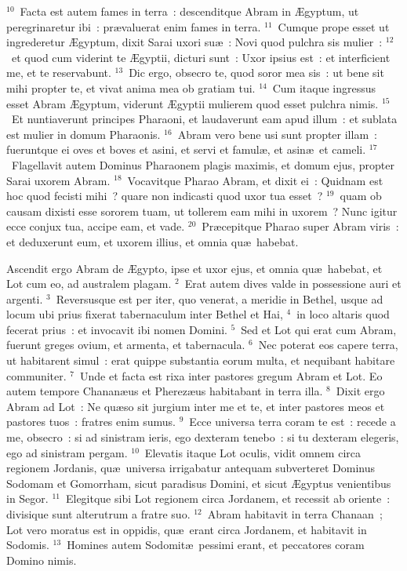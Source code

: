 ${}^{10}$~Facta est autem fames in terra~: descenditque Abram in \AE gyptum, ut peregrinaretur ibi~: pr\ae valuerat enim fames in terra.
${}^{11}$~Cumque prope esset ut ingrederetur \AE gyptum, dixit Sarai uxori su\ae~: Novi quod pulchra sis mulier~:
${}^{12}$~et quod cum viderint te \AE gyptii, dicturi sunt~: Uxor ipsius est~: et interficient me, et te reservabunt.
${}^{13}$~Dic ergo, obsecro te, quod soror mea sis~: ut bene sit mihi propter te, et vivat anima mea ob gratiam tui.
${}^{14}$~Cum itaque ingressus esset Abram \AE gyptum, viderunt \AE gyptii mulierem quod esset pulchra nimis.
${}^{15}$~Et nuntiaverunt principes Pharaoni, et laudaverunt eam apud illum~: et sublata est mulier in domum Pharaonis.
${}^{16}$~Abram vero bene usi sunt propter illam~: fueruntque ei oves et boves et asini, et servi et famul\ae , et asin\ae\ et cameli.
${}^{17}$~Flagellavit autem Dominus Pharaonem plagis maximis, et domum ejus, propter Sarai uxorem Abram.
${}^{18}$~Vocavitque Pharao Abram, et dixit ei~: Quidnam est hoc quod fecisti mihi~? quare non indicasti quod uxor tua esset~?
${}^{19}$~quam ob causam dixisti esse sororem tuam, ut tollerem eam mihi in uxorem~? Nunc igitur ecce conjux tua, accipe eam, et vade.
${}^{20}$~Pr\ae cepitque Pharao super Abram viris~: et deduxerunt eum, et uxorem illius, et omnia qu\ae\ habebat.

\lettrine[lines=3,image=true,loversize=0.05,lraise=-0.03]{A}{}scendit ergo Abram de \AE gypto, ipse et uxor ejus, et omnia qu\ae\ habebat, et Lot cum eo, ad australem plagam.
${}^{2}$~Erat autem dives valde in possessione auri et argenti.
${}^{3}$~Reversusque est per iter, quo venerat, a meridie in Bethel, usque ad locum ubi prius fixerat tabernaculum inter Bethel et Hai,
${}^{4}$~in loco altaris quod fecerat prius~: et invocavit ibi nomen Domini.
${}^{5}$~Sed et Lot qui erat cum Abram, fuerunt greges ovium, et armenta, et tabernacula.
${}^{6}$~Nec poterat eos capere terra, ut habitarent simul~: erat quippe substantia eorum multa, et nequibant habitare communiter.
${}^{7}$~Unde et facta est rixa inter pastores gregum Abram et Lot. Eo autem tempore Chanan\ae us et Pherez\ae us habitabant in terra illa.
${}^{8}$~Dixit ergo Abram ad Lot~: Ne qu\ae so sit jurgium inter me et te, et inter pastores meos et pastores tuos~: fratres enim sumus.
${}^{9}$~Ecce universa terra coram te est~: recede a me, obsecro~: si ad sinistram ieris, ego dexteram tenebo~: si tu dexteram elegeris, ego ad sinistram pergam.
${}^{10}$~Elevatis itaque Lot oculis, vidit omnem circa regionem Jordanis, qu\ae\ universa irrigabatur antequam subverteret Dominus Sodomam et Gomorrham, sicut paradisus Domini, et sicut \AE gyptus venientibus in Segor.
${}^{11}$~Elegitque sibi Lot regionem circa Jordanem, et recessit ab oriente~: divisique sunt alterutrum a fratre suo.
${}^{12}$~Abram habitavit in terra Chanaan~; Lot vero moratus est in oppidis, qu\ae\ erant circa Jordanem, et habitavit in Sodomis.
${}^{13}$~Homines autem Sodomit\ae\ pessimi erant, et peccatores coram Domino nimis.


